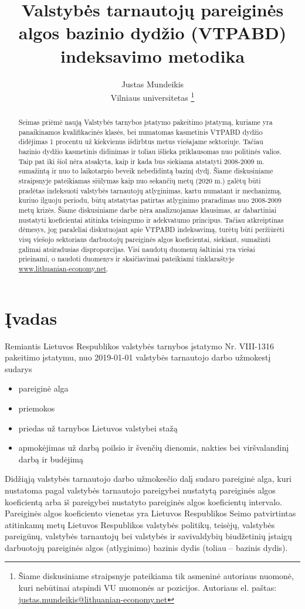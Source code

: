 \documentclass[titlepage, 11pt]{article}
\author{Justas Mundeikis\\ Vilniaus universitetas \footnote{Šiame diskusiniame straipsnyje pateikiama tik asmeninė autoriaus nuomonė, kuri nebūtinai atspindi VU nuomonės ar pozicijos. Autoriaus el. paštas: \href{mailto: justas.mundeikis@lithuanian-economy.net}{justas.mundeikis@lithuanian-economy.net} }}
\title{Valstybės tarnautojų pareiginės algos bazinio dydžio (VTPABD) \\ indeksavimo metodika}
\begin{document}
\maketitle


\begin{abstract}
Seimas priėmė naują Valstybės tarnybos įstatymo pakeitimo įstatymą, kuriame yra panaikinamos kvalifikacinės klasės, bei numatomas kasmetinis VTPABD dydžio didėjimas 1 procentu už kiekvienus išdirbtus metus viešajame sektoriuje. Tačiau bazinio dydžio kasmetinis didinimas ir toliau išlieka priklausomas nuo politinės valios.
Taip pat iki šiol nėra atsakyta, kaip ir kada bus siekiama atstatyti 2008-2009 m. sumažintą ir nuo to laikotarpio beveik nebedidintą bazinį dydį. 
Šiame diskusiniame straipsnyje pateikiamas siūlymas kaip nuo sekančių metų (2020 m.) galėtų būti pradėtas indeksuoti valstybės tarnautojų atlyginimas, kartu numatant ir mechanizmą, kuriuo ilguoju periodu, būtų atstatytas patirtas atlyginimo praradimas nuo 2008-2009 metų krizės. Šiame diskusiniame darbe nėra analizuojamas klausimas, ar dabartiniai nustatyti koeficientai atitinka teisingumo ir adekvatumo principus. Tačiau atkreiptinas dėmesys, jog paraleliai diskutuojant apie VTPABD indeksavimą, turėtų būti peržiūrėti visų viešojo sektoriaus darbuotojų pareiginės algos koeficientai, siekiant, sumažinti galimai atsiradusias disproporcijas.
Visi naudotų duomenų šaltiniai yra viešai prieinami, o naudoti duomenys ir skaičiavimai pateikiami tinklaraštyje \href{www.lithuanian-economy.net}{www.lithuanian-economy.net}.
\end{abstract}

\tableofcontents
\newpage

\section{Įvadas}
Remiantis Lietuvos Respublikos valstybės tarnybos įstatymo Nr. VIII-1316 pakeitimo įstatymu, nuo 2019-01-01 valstybės tarnautojo darbo užmokestį sudarys 
\begin{itemize}
\setlength\itemsep{-0.5em}
\item pareiginė alga
\item priemokos
\item priedas už tarnybos Lietuvos valstybei stažą
\item apmokėjimas už darbą poilsio ir švenčių dienomis, nakties bei viršvalandinį darbą ir budėjimą
\end{itemize}

Didžiąją valstybės tarnautojo darbo užmokesčio dalį sudaro pareiginė alga, kuri nustatoma pagal valstybės tarnautojo pareigybei nustatytą pareiginės algos koeficientą arba iš pareigybei nustatyto pareiginės algos koeficientų intervalo. Pareiginės algos koeficiento vienetas yra Lietuvos Respublikos Seimo patvirtintas atitinkamų metų Lietuvos Respublikos valstybės politikų, teisėjų, valstybės pareigūnų, valstybės tarnautojų bei valstybės ir savivaldybių biudžetinių įstaigų darbuotojų pareiginės algos (atlyginimo) bazinis dydis (toliau – bazinis dydis). 
\end{document}
